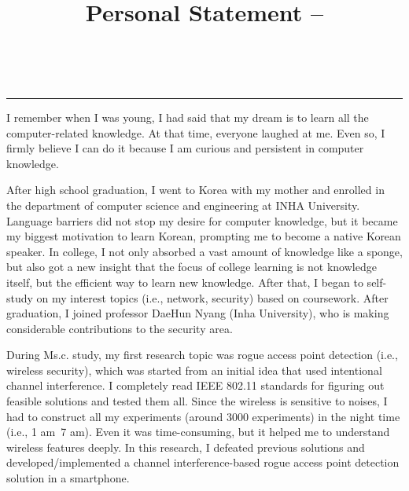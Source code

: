 \documentclass{NSF}
\begin{document}
\title{Personal Statement -- }
\\\rule{\textwidth}{1.5pt}\vspace{1mm}
\thispagestyle{empty}

I remember when I was young, I had said that my dream is to learn all the computer-related knowledge. At that time, everyone laughed at me. Even so, I firmly believe I can do it because I am curious and persistent in computer knowledge. 

After high school graduation, I went to Korea with my mother and enrolled in the department of computer science and engineering at INHA University. Language barriers did not stop my desire for computer knowledge, but it became my biggest motivation to learn Korean, prompting me to become a native Korean speaker. In college, I not only absorbed a vast amount of knowledge like a sponge, but also got a new insight that the focus of college learning is not knowledge itself, but the efficient way to learn new knowledge. After that, I began to self-study on my interest topics (i.e., network, security) based on coursework. After graduation, I joined professor DaeHun Nyang (Inha University), who is making considerable contributions to the security area. 

During Ms.c. study, my first research topic was rogue access point detection (i.e., wireless security), which was started from an initial idea that used intentional channel interference. I completely read IEEE 802.11 standards for figuring out feasible solutions and tested them all. Since the wireless is sensitive to noises, I had to construct all my experiments (around 3000 experiments) in the night time (i.e., 1 am~7 am). Even it was time-consuming, but it helped me to understand wireless features deeply. In this research, I defeated previous solutions and developed/implemented a channel interference-based rogue access point detection solution in a smartphone. 
\end{document}
